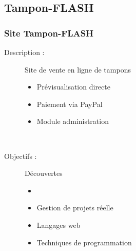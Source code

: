 \subsection{Tampon-FLASH}

\begin{frame}
	\frametitle{Site Tampon-FLASH}

	\begin{description}
		\item[Description :] Site de vente en ligne de tampons
			\begin{itemize}
				\item Prévisualisation directe
				\item Paiement via PayPal
				\item Module administration
			\end{itemize}~

		\item[Objectifs : ] Découvertes
			\begin{itemize}
				\item \fidit
				\item Gestion de projets \og réelle \fg\sautligne

				\item Langages web
				\item Techniques de programmation
			\end{itemize}
	\end{description}
\end{frame}
